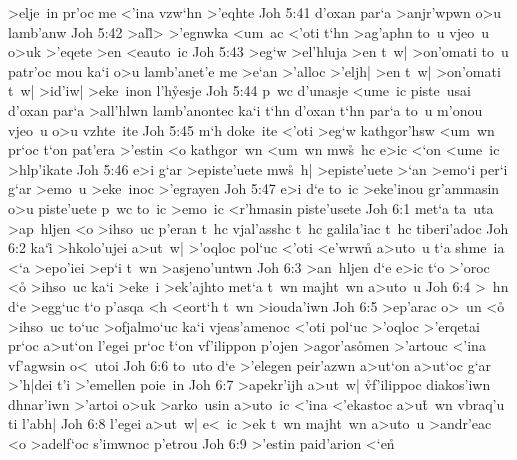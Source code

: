 >elje~in
pr'oc
me
<'ina
vzw`hn
>'eqhte\bibvsend
\vs Joh 5:41
d'oxan
par`a
>anjr'wpwn
o>u
lamb'anw\bibvsend
\vs Joh 5:42
>al\r{l}>
>'egnwka
<um~ac
<'oti
t`hn
>ag'aphn
to~u
vjeo~u
o>uk
>'eqete
>en
<eauto~ic\bibvsend
\vs Joh 5:43
>eg`w
>el'hluja
>en
t~w|
>on'omati
to~u
patr'oc
mou
ka`i
o>u
lamb'anet'e
me
>e`an
>'alloc
>'eljh|
>en
t~w|
>on'omati
t~w|
>id'iw|
>eke~inon
l'h\r{y}esje\bibvsend
{}
\vs Joh 5:44
p~wc
d'unasje
<ume~ic
piste~usai
d'oxan
par`a
>all'hlwn
lamb'anontec
ka`i
t`hn
d'oxan
t`hn
par`a
to~u
m'onou
vjeo~u
o>u
vzhte~ite\bibvsend
\vs Joh 5:45
m`h
doke~ite
<'oti
>eg`w
kathgor'hsw
<um~wn
pr`oc
t`on
pat'era
>'estin
<o
kathgor~wn
<um~wn
mw\r{s}~hc
e>ic
<`on
<ume~ic
>hlp'ikate\bibvsend
\vs Joh 5:46
e>i
g`ar
>episte'uete
mw\r{s}~h|
>episte'uete
>`an
>emo`i
per`i
g`ar
>emo~u
>eke~inoc
>'egrayen\bibvsend
\vs Joh 5:47
e>i
d`e
to~ic
>eke'inou
gr'ammasin
o>u
piste'uete
p~wc
to~ic
>emo~ic
<r'hmasin
piste'usete\bibvsend
\vs Joh 6:1
met`a
ta~uta
>ap~hljen
<o
>ihso~uc
p'eran
t~hc
vjal'asshc
t~hc
galila'iac
t~hc
tiberi'adoc\bibvsend
\vs Joh 6:2
ka`i\r{}
>hkolo'ujei
a>ut~w|
>'oqloc
pol`uc
<'oti
<e'wrwn\r{}
a>uto~u
t`a
shme~ia
<`a
>epo'iei
>ep`i
t~wn
>asjeno'untwn\bibvsend
\vs Joh 6:3
>an~hljen
d`e
e>ic
t`o
>'oroc
<o\r{}
>ihso~uc
ka`i
>eke~i
>ek'ajhto
met`a
t~wn
majht~wn
a>uto~u\bibvsend
\vs Joh 6:4
>~hn
d`e
>egg`uc
t`o
p'asqa
<h
<eort`h
t~wn
>iouda'iwn\bibvsend
\vs Joh 6:5
>ep'arac
o>~un
<o\r{}
>ihso~uc
to`uc
>ofjalmo`uc
ka`i
vjeas'amenoc
<'oti
pol`uc
>'oqloc
>'erqetai
pr`oc
a>ut`on
l'egei
pr`oc
\r{t}`on
vf'ilippon
p'ojen
>agor'as\r{o}men
>'artouc
<'ina
vf'agwsin
o<~utoi\bibvsend
\vs Joh 6:6
to~uto
d`e
>'elegen
peir'azwn
a>ut`on
a>ut`oc
g`ar
>'h|dei
t'i
>'emellen
poie~in\bibvsend
\vs Joh 6:7
>apekr'ijh
a>ut~w|
\r{vf}'ilippoc
diakos'iwn
dhnar'iwn
>'artoi
o>uk
>arko~usin
a>uto~ic
<'ina
<'ekastoc
a>u\r{t}~wn
vbraq'u
ti
l'abh|\bibvsend
\vs Joh 6:8
l'egei
a>ut~w|
e<~ic
>ek
t~wn
majht~wn
a>uto~u
>andr'eac
<o
>adelf`oc
s'imwnoc
p'etrou\bibvsend
\vs Joh 6:9
>'estin
paid'arion
<`en\r{}
